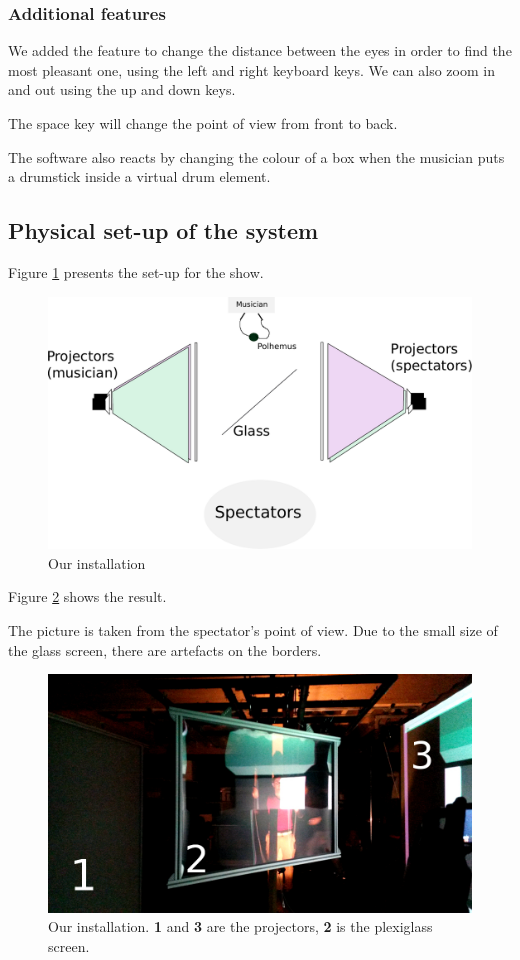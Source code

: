 \subsubsection{Additional features}
We added the feature to change the distance between the eyes in order to find the most pleasant one, using the left and right keyboard keys.
We can also zoom in and out using the up and down keys.

The space key will change the point of view from front to back.

The software also reacts by changing the colour of a box when the musician puts a drumstick inside a virtual drum element.

\subsection{Physical set-up of the system}
Figure \ref{fig:schemaPA} presents the set-up for the show.

\begin{figure}[h!]
\centering
\includegraphics[scale=0.8]{image/schemaPercu.pdf}
\caption{Our installation}
\label{fig:schemaPA}
\end{figure}

\newpage
Figure \ref{fig:percuIRL} shows the result.

The picture is taken from the spectator's point of view. Due to the small size of the glass screen, there are artefacts on the borders. 

\begin{figure}[h!]
\centering
\includegraphics[scale=0.45]{image/percuIRL.jpg}
\caption{Our installation. \textbf{1} and \textbf{3} are the projectors, \textbf{2} is the plexiglass screen.}
\label{fig:percuIRL}
\end{figure}

